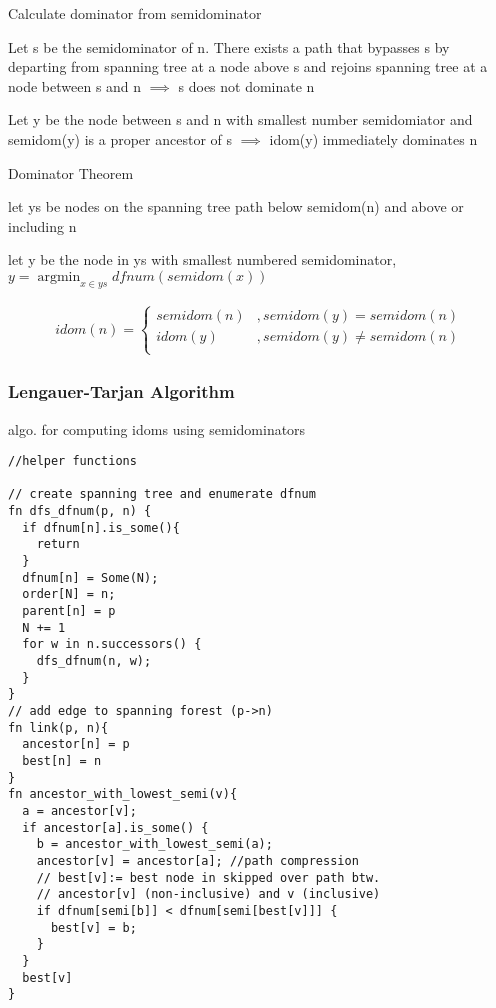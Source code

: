 \documentclass[8pt]{extarticle}
\DeclareMathOperator*{\argmin}{argmin}
\begin{document}
\begin{multicols*}{2}
  Calculate dominator from semidominator

  Let s be the semidominator of n. There exists a path that bypasses s by departing from spanning tree at a node above s and rejoins spanning tree at a node between s and n $\implies$ s does not dominate n

  Let y be the node between s and n with smallest number semidomiator and semidom(y) is a proper ancestor of s $\implies$ idom(y) immediately dominates n

  Dominator Theorem

  let ys be nodes on the spanning tree path below semidom(n) and above or including n
  
  let y be the node in ys with smallest numbered semidominator, $y=\argmin_{x \in ys} dfnum(semidom(x))$

  \begin{align*}
    idom(n) = \begin{cases}
      semidom(n) &, semidom(y) = semidom(n)\\
      idom(y) &, semidom(y) \neq semidom(n)\\
    \end{cases}
  \end{align*}

\vfill\null
\pagebreak

  \subsubsection{Lengauer-Tarjan Algorithm}

  algo. for computing idoms using semidominators

\begin{verbatim}
//helper functions

// create spanning tree and enumerate dfnum
fn dfs_dfnum(p, n) {
  if dfnum[n].is_some(){
    return
  }
  dfnum[n] = Some(N);
  order[N] = n;
  parent[n] = p
  N += 1
  for w in n.successors() {
    dfs_dfnum(n, w);
  }
}
// add edge to spanning forest (p->n)
fn link(p, n){
  ancestor[n] = p
  best[n] = n
}
fn ancestor_with_lowest_semi(v){
  a = ancestor[v];
  if ancestor[a].is_some() {
    b = ancestor_with_lowest_semi(a);
    ancestor[v] = ancestor[a]; //path compression
    // best[v]:= best node in skipped over path btw.
    // ancestor[v] (non-inclusive) and v (inclusive)
    if dfnum[semi[b]] < dfnum[semi[best[v]]] {
      best[v] = b;
    }
  }
  best[v]
}
\end{verbatim}

\vfill\null
\columnbreak


\end{multicols*}
\end{document}
